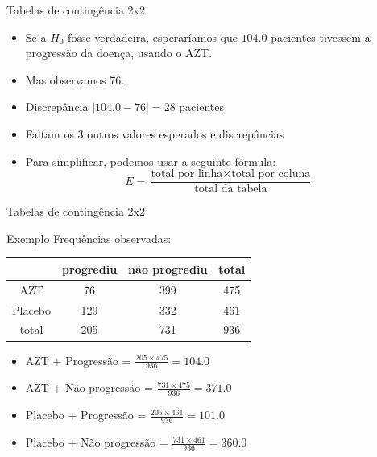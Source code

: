 \documentclass{beamer}
\begin{document}
\begin{frame}{Tabelas de contingência 2x2}
  \begin{itemize}
    \small
  \item Se a $H_0$ fosse verdadeira, esperaríamos que $104.0$
    pacientes tivessem a progressão da doença, usando o AZT.
    \bigskip
  \item Mas observamos 76.
  \item Discrepância $|104.0 - 76| = 28$ pacientes
    \bigskip
    \bigskip
    \footnotesize
  \item Faltam os 3 outros valores esperados e discrepâncias
    \bigskip
    \bigskip
  \item Para simplificar, podemos usar a seguinte fórmula:
  \begin{displaymath}
    E = \frac{ \text{total por linha} \times \text{total por coluna}
    }{ \text{total da tabela} }
  \end{displaymath}
  \end{itemize}
\end{frame}

\begin{frame}{Tabelas de contingência 2x2}
  \begin{exampleblock}{Exemplo}
    Frequências observadas:
    \begin{tabular}{c|c|c|c}
      & progrediu & não progrediu & total\\
      \hline
      AZT & 76 & 399 & 475\\
      \hline
      Placebo & 129 & 332 & 461\\
      \hline
      total & 205 & 731 & 936\\
    \end{tabular}
  \end{exampleblock}
  \vfill
  \begin{itemize}
    \scriptsize
  \item AZT + Progressão = $\frac{205 \times 475}{936} = 104.0$
  \item AZT + Não progressão = $\frac{731 \times 475}{936} = 371.0$
  \item Placebo + Progressão = $\frac{205 \times 461}{936} = 101.0$
  \item Placebo + Não progressão = $\frac{731 \times 461}{936} = 360.0$
  \end{itemize}
\end{frame}
\end{document}
